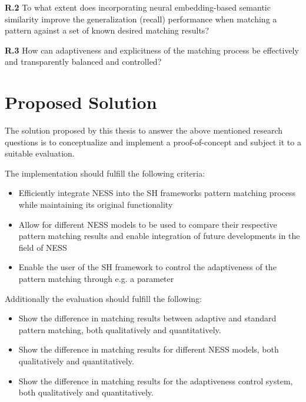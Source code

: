 \documentclass[11pt]{scrreprt}
\begin{document}
\textbf{R.2} To what extent does incorporating neural embedding-based semantic similarity improve the generalization (recall) performance when matching a pattern against a set of known desired matching results?

\textbf{R.3} How can adaptiveness and explicitness of the matching process be effectively and transparently balanced and controlled?



\section{Proposed Solution}

The solution proposed by this thesis to answer the above mentioned research questions is to conceptualize and implement a proof-of-concept and subject it to a suitable evaluation. 

The implementation should fulfill the following criteria:

\begin{itemize}
	\item Efficiently integrate NESS into the SH frameworks pattern matching process while maintaining its original functionality
	\item Allow for different NESS models to be used to compare their respective pattern matching results and enable integration of future developments in the field of NESS
	\item Enable the user of the SH framework to control the adaptiveness of the pattern matching through e.g. a parameter
\end{itemize}


Additionally the evaluation should fulfill the following:

\begin{itemize}
	\item Show the difference in matching results between adaptive and standard pattern matching, both qualitatively and quantitatively.
	\item Show the difference in matching results for different NESS models, both qualitatively and quantitatively.
	\item Show the difference in matching results for the adaptiveness control system, both qualitatively and quantitatively.


\end{itemize}
\end{document}
